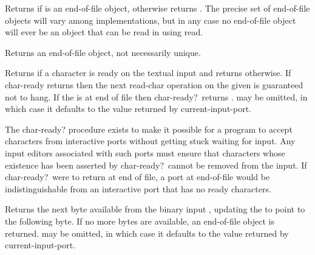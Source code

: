 \begin{entry}{%
}

Returns \schtrue{} if  is an end-of-file object, otherwise returns
\schfalse.  The precise set of end-of-file objects will vary among
implementations, but in any case no end-of-file object will ever be an object
that can be read in using {\cf read}.

\end{entry}

\begin{entry}{%
}

Returns an end-of-file object, not necessarily unique.

\end{entry}


\begin{entry}{%
}

Returns \schtrue{} if a character is ready on the textual input  and
returns \schfalse{} otherwise.  If {\cf char-ready} returns \schtrue{} then
the next {\cf read-char} operation on the given  is guaranteed
not to hang.  If the  is at end of file then {\cf char-ready?}\
returns \schtrue.   may be omitted, in which case it defaults to
the value returned by {\cf current-input-port}.

\begin{rationale}
The {\cf char-ready?} procedure exists to make it possible for a program to
accept characters from interactive ports without getting stuck waiting for
input.  Any input editors associated with such ports must ensure that
characters whose existence has been asserted by {\cf char-ready?}\ cannot
be removed from the input.  If {\cf char-ready?}\ were to return \schfalse{} at end of
file, a port at end-of-file would be indistinguishable from an interactive
port that has no ready characters.
\end{rationale}
\end{entry}

\begin{entry}{%
}

Returns the next byte available from the binary input ,
updating the \var{port} to point to the following byte.  
If no more bytes are
available, an end-of-file object is returned.   may be
omitted, in which case it defaults to the value returned by {\cf
  current-input-port}.

\end{entry}

